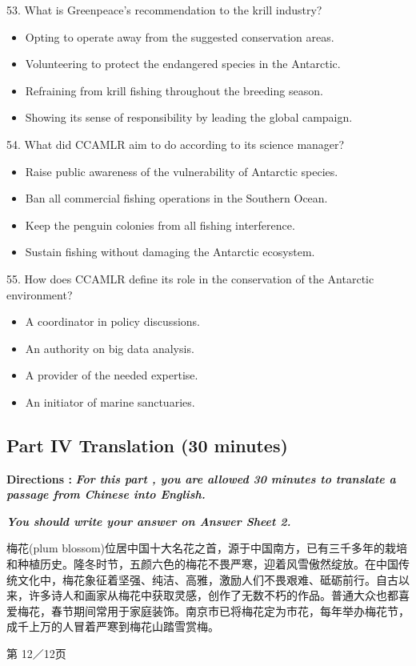\documentclass[UTF8,11pt]{ctexart}
\begin{document}
53. What is Greenpeace's recommendation to the krill industry?


\begin{itemize}[leftmargin=2em,itemsep=.2em,topsep=.4em]\item[A.] Opting to operate away from the suggested conservation areas.
\item[B.] Volunteering to protect the endangered species in the Antarctic.
\item[C.] Refraining from krill fishing throughout the breeding season.
\item[D.] Showing its sense of responsibility by leading the global campaign.
\end{itemize}

54. What did CCAMLR aim to do according to its science manager?


\begin{itemize}[leftmargin=2em,itemsep=.2em,topsep=.4em]\item[A.] Raise public awareness of the vulnerability of Antarctic species.
\item[B.] Ban all commercial fishing operations in the Southern Ocean.
\item[C.] Keep the penguin colonies from all fishing interference.
\item[D.] Sustain fishing without damaging the Antarctic ecosystem.
\end{itemize}

55. How does CCAMLR define its role in the conservation of the Antarctic environment?


\begin{itemize}[leftmargin=2em,itemsep=.2em,topsep=.4em]\item[A.] A coordinator in policy discussions.
\item[B.] An authority on big data analysis.
\item[C.] A provider of the needed expertise.
\item[D.] An initiator of marine sanctuaries.
\end{itemize}

\subsection*{\textbf{Part IV} \textbf{Translation} \textbf{(30 minutes)}}


\textbf{Directions : }\textbf{\textit{For this part , you are allowed 30 minutes to translate a passage from Chinese into English.}}


\textbf{\textit{You should write your answer on Answer Sheet 2.}}


梅花(plum blossom)位居中国十大名花之首，源于中国南方，已有三千多年的栽培和种植历史。隆冬时节，五颜六色的梅花不畏严寒，迎着风雪傲然绽放。在中国传统文化中，梅花象征着坚强、纯洁、高雅，激励人们不畏艰难、砥砺前行。自古以来，许多诗人和画家从梅花中获取灵感，创作了无数不朽的作品。普通大众也都喜爱梅花，春节期间常用于家庭装饰。南京市已将梅花定为市花，每年举办梅花节，成千上万的人冒着严寒到梅花山踏雪赏梅。


第 12／12页
\end{document}
